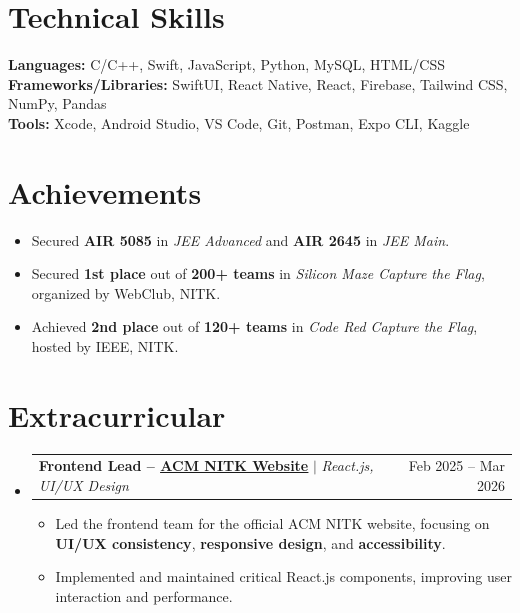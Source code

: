 \documentclass[letterpaper,11pt]{article}
\makeatletter
\newcommand{\resumeItem}[1]{
  \item\small{
    {#1 \vspace{-2pt}}
  }
}
\newcommand{\resumeProjectHeading}[2]{
    \item
    \begin{tabular*}{0.97\textwidth}{l@{\extracolsep{\fill}}r}
      \small#1 & #2 \\
    \end{tabular*}\vspace{-7pt}
}
\newcommand{\resumeSubHeadingListStart}{\begin{itemize}[leftmargin=0.15in, label={}]}
\newcommand{\resumeSubHeadingListEnd}{\end{itemize}}
\newcommand{\resumeItemListStart}{\begin{itemize}}
\newcommand{\resumeItemListEnd}{\end{itemize}\vspace{-5pt}}
\makeatother
\begin{document}
%
\section{Technical Skills}
\begin{itemize}[leftmargin=0.15in, label={}]
  \small{
    \item{
      \textbf{Languages:} C/C++, Swift, JavaScript, Python, MySQL, HTML/CSS \\
      \textbf{Frameworks/Libraries:} SwiftUI, React Native, React, Firebase, Tailwind CSS, NumPy, Pandas \\
\textbf{Tools:} Xcode, Android Studio, VS Code, Git, Postman, Expo CLI, Kaggle
    }
  }
\end{itemize}

\section{Achievements}
\begin{itemize}[leftmargin=0.33in]  %
 \item Secured \textbf{AIR 5085} in \textit{JEE Advanced} and \textbf{AIR 2645} in \textit{JEE Main}.
 \item Secured \textbf{1st place} out of \textbf{200+ teams} in \textit{Silicon Maze Capture the Flag}, organized by WebClub, NITK.
 \item Achieved \textbf{2nd place} out of \textbf{120+ teams} in \textit{Code Red Capture the Flag}, hosted by IEEE, NITK.
\end{itemize}
\section{Extracurricular}
\resumeSubHeadingListStart

\resumeProjectHeading
{\textbf{Frontend Lead – \underline{\href{https://acm.nitk.ac.in}{ACM NITK Website}}} $|$ \emph{React.js, UI/UX Design}}{Feb 2025 – Mar 2026}
\resumeItemListStart
  \resumeItem{Led the frontend team for the official ACM NITK website, focusing on \textbf{UI/UX consistency}, \textbf{responsive design}, and \textbf{accessibility}.}
  \resumeItem{Implemented and maintained critical React.js components, improving user interaction and performance.}
\resumeItemListEnd
\resumeSubHeadingListEnd
\end{document}
